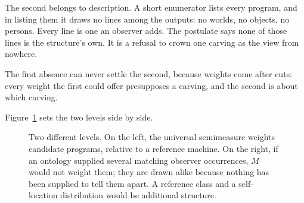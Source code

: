 The second belongs to description. A short enumerator lists every program, and in listing them it draws no lines among the outputs: no worlds, no objects, no persons. Every line is one an observer adds. The postulate says none of those lines is the structure's own. It is a refusal to crown one carving as the view from nowhere.

The first absence can never settle the second, because weights come after cuts: every weight the first could offer presupposes a carving, and the second is about which carving.

Figure~\ref{fig:doubled-indifference} sets the two levels side by side.

\begin{figure}[h]
\centering
{}
\caption{Two different levels. On the left, the universal semimeasure weights candidate programs, relative to a reference machine. On the right, if an ontology supplied several matching observer occurrences, $M$ would not weight them; they are drawn alike because nothing has been supplied to tell them apart. A reference class and a self-location distribution would be additional structure.}
\label{fig:doubled-indifference}
\end{figure}
\FloatBarrier

